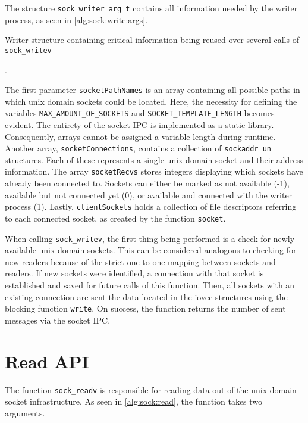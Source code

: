 The structure \texttt{sock\_writer\_arg\_t} contains all information needed by the writer process, as seen in \ref{alg:sock:write:args}.

\begin{algorithm}[h!]
    
    \caption[Socket: Writer structure]{Writer structure containing critical information being reused over several calls of \texttt{sock\_writev}}.
    \label{alg:sock:write:args}
\end{algorithm}

The first parameter \texttt{socketPathNames} is an array containing all possible paths in which unix domain sockets could be located.
Here, the necessity for defining the variables \texttt{MAX\_AMOUNT\_OF\_SOCKETS} and \texttt{SOCKET\_TEMPLATE\_LENGTH} becomes evident.
The entirety of the socket \ac{IPC} is implemented as a static library.
Consequently, arrays cannot be assigned a variable length during runtime.
Another array, \texttt{socketConnections}, contains a collection of \texttt{sockaddr\_un} structures.
Each of these represents a single unix domain socket and their address information.
The array \texttt{socketRecvs} stores integers displaying which sockets have already been connected to.
Sockets can either be marked as not available (-1), available but not connected yet (0), or available and connected with the writer process (1).
Lastly, \texttt{clientSockets} holds a collection of file descriptors referring to each connected socket, as created by the function \texttt{socket}.

When calling \texttt{sock\_writev}, the first thing being performed is a check for newly available unix domain sockets.
This can be considered analogous to checking for new readers because of the strict one-to-one mapping between sockets and readers.
If new sockets were identified, a connection with that socket is established and saved for future calls of this function.
Then, all sockets with an existing connection are sent the data located in the iovec structures using the blocking function \texttt{write}.
On success, the function returns the number of sent messages via the socket \ac{IPC}.

\section{Read \ac{API}}
\label{cha:ReadAPI}
The function \texttt{sock\_readv} is responsible for reading data out of the unix domain socket infrastructure.
As seen in \ref{alg:sock:read}, the function takes two arguments.

